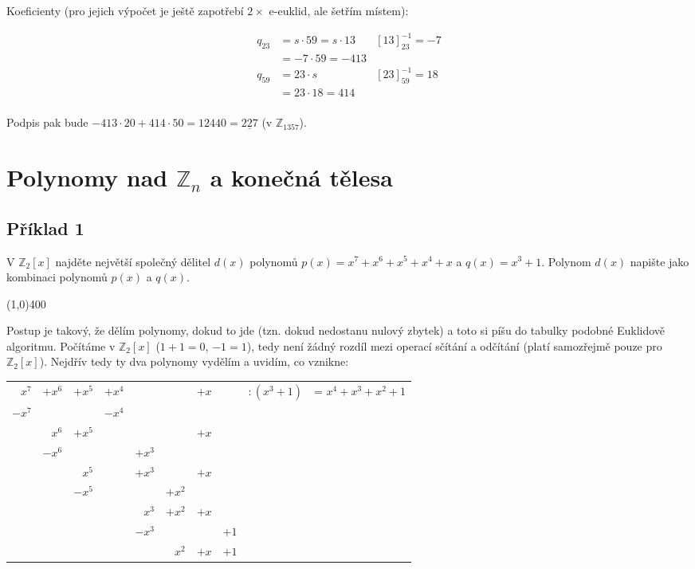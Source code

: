 \documentclass{article}
\begin{document}
Koeficienty (pro jejich výpočet je ještě zapotřebí $2\times$ e-euklid, ale šetřím místem):

\begin{align*}
q_{23} & = s\cdot 59 = s\cdot 13 & \left[ 13\right]^{-1}_{23} = -7\\
		& = -7 \cdot 59 = -413 \\
q_{59} & = 23 \cdot s & \left[ 23\right]^{-1}_{59} = 18\\
		& = 23 \cdot 18 = 414 \\
\end{align*}

Podpis pak bude $-413\cdot20 + 414\cdot50 = 12440 = \underline{227}$ (v $\mathbb{Z}_{1357}$).

\clearpage

\section{Polynomy nad $\mathbb{Z}_n$ a konečná tělesa }

\subsection{Příklad 1}
V $\mathbb{Z}_2[x]$ najděte největší společný dělitel $d(x)$ polynomů $p(x) = x^7 + x^6 + x^5 + x^4 + x$ a $q(x) = x^3 + 1$. Polynom $d(x)$ napište jako kombinaci polynomů $p(x)$ a $q(x)$. 

\line(1,0){400}

Postup je takový, že dělím polynomy, dokud to jde (tzn. dokud nedostanu nulový zbytek) a toto si píšu do tabulky podobné Euklidově algoritmu. Počítáme v \(\mathbb{Z}_2[x]\) (\(1+1=0\), \(-1=1\)), tedy není žádný rozdíl mezi operací sčítání a odčítání (platí samozřejmě pouze pro \(\mathbb{Z}_2[x]\)). Nejdřív tedy ty dva polynomy vydělím a uvidím, co vznikne:

\begin{tabular}{rrrrrrrr|ll}
		$x^7$ 	& $+x^6$ 	& $+ x^5$ & $+x^4$ 	&   				&  				& $+ x$  	&  		& $: (x^3 + 1)$ 	& = $x^4 + x^3 + x^2 + 1$ \\ 
		$-x^7$ 	& 				&  				&  $-x^4$ &   				&  				& 	 			&  		& 								&  \\ 
		\cline{1-4}
		 				&  $x^6$	& $+ x^5$	&         &   				&  				& $+ x$		&  		& 								&  \\ 
		 				&  $-x^6$	& 				&         & $+ x^3$  	&  				& 				&  		& 								&  \\ 
		\cline{2-5}
		 				&    			& $x^5$		&         & $+ x^3$		& 				& $+ x$		&  		& 								&  \\ 
		 				&    			& $-x^5$	&        	& 					&$+ x^2$	& 				&  		& 								&  \\ 
		\cline{3-6}
		 				&    			& 				&        	& $x^3$			&$+ x^2$	& $+ x$		&  		& 								&  \\
		 				&    			& 				&        	& $-x^3$		&					& 			  &$+1$	& 								&  \\  
		\cline{5-8}
						&    			& 				&        	& 					&	$x^2$		& $+ x$	  &$+1$	& 								&  \\  
		
\end{tabular}
\end{document}
